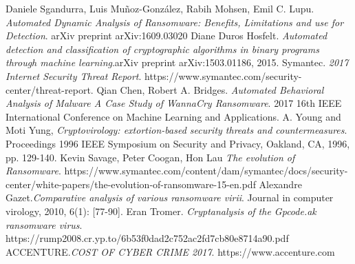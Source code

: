 \documentclass[]{PLR-ShaofengLiu}
\begin{document}
\begin{thebibliography}{99}
Daniele Sgandurra, Luis Muñoz-González, Rabih Mohsen, Emil C. Lupu. \emph{Automated Dynamic Analysis of Ransomware:
Benefits, Limitations and use for Detection}. arXiv preprint arXiv:1609.03020
Diane Duros Hosfelt. \emph{Automated detection and classification
of cryptographic algorithms in binary
programs through machine learning}.arXiv preprint arXiv:1503.01186, 2015.
 Symantec. \emph{2017 Internet Security Threat Report}. https://www.symantec.com/security-center/threat-report.
Qian Chen, Robert A. Bridges. \emph{Automated Behavioral Analysis of Malware
A Case Study of WannaCry Ransomware}. 2017 16th IEEE International Conference on Machine Learning and Applications.
A. Young and Moti Yung, \emph{Cryptovirology: extortion-based security threats and countermeasures}. Proceedings 1996 IEEE Symposium on Security and Privacy, Oakland, CA, 1996, pp. 129-140.
Kevin Savage, Peter Coogan, Hon Lau \emph{The evolution of Ransomware}. https://www.symantec.com/content/dam/symantec/docs/security-center/white-papers/the-evolution-of-ransomware-15-en.pdf
Alexandre Gazet.\emph{Comparative analysis of various ransomware virii}. Journal in computer virology, 2010, 6(1): [77-90].
Eran Tromer. \emph{Cryptanalysis of the Gpcode.ak ransomware virus}. https://rump2008.cr.yp.to/6b53f0dad2c752ac2fd7cb80e8714a90.pdf
ACCENTURE.\emph{COST OF CYBER CRIME 2017}. https://www.accenture.com



\label{endpage}
\end{thebibliography}
\end{document}
